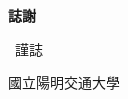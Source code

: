 \thispagestyle{empty}

\begin{center}
\Large
\textbf{誌\hspace{1cm}謝}
\end{center}

\vspace{1cm}
\linespread{1.5}%
\selectfont
\noindent




\vspace{3cm}
\begin{flushright}
\studentCnName \ 謹誌

國立陽明交通大學\ \NameofDepartmentInstituteCN

\ThesisDateTW
\end{flushright}
